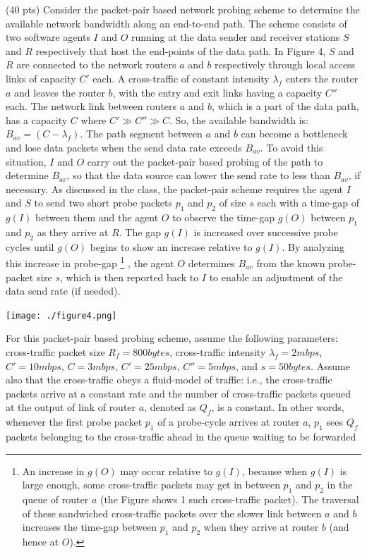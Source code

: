 \documentclass{jhwhw}
\begin{document}
\newpage
\problem{}
\noindent (40 pts) Consider the packet-pair based network probing scheme to determine the available network bandwidth along an end-to-end path. The scheme consists of two software agents $I$ and $O$ running at the data sender and receiver stations $S$ and $R$ respectively that host the end-points of the data path. In Figure 4, $S$ and $R$ are connected to the network routers $a$ and $b$ respectively through local access links of capacity $C'$ each. A cross-traffic of constant intensity $\lambda_{f}$ enters the router $a$ and leaves the router $b$, with the entry and exit links having a capacity $C''$ each. The network link between routers $a$ and $b$, which is a part of the data path, has a capacity $C$ where $C' \gg C'' \gg C$. So, the available bandwidth is: $B_{av} = (C - \lambda_{f})$. The path segment between $a$ and $b$ can become a bottleneck and lose data packets when the send data rate exceeds $B_{av}$. To avoid this situation, $I$ and $O$ carry out the packet-pair based probing of the path to determine $B_{av}$, so that the data source can lower the send rate to less than $B_{av}$, if necessary. As discussed in the class, the packet-pair scheme requires the agent $I$ and $S$ to send two short probe packets $p_{1}$ and $p_{2}$ of size $s$ each with a time-gap of $g(I)$ between them and the agent $O$ to observe the time-gap $g(O)$ between $p_{1}$ and $p_{2}$ as they arrive at $R$. The gap $g(I)$ is increased over successive probe cycles until $g(O)$ begins to show an increase relative to $g(I)$. By analyzing this increase in probe-gap
\footnote{An increase in $g(O)$ may occur relative to $g(I)$, because when $g(I)$ is large enough, some cross-traffic packets may get in between $p_{1}$ and $p_{2}$ in the queue of router $a$ (the Figure shows 1 such cross-traffic packet). The traversal of these sandwiched cross-traffic packets over the slower link between $a$ and $b$ increases the time-gap between $p_{1}$ and $p_{2}$ when they arrive at router $b$ (and hence at $O$).}
, the agent $O$ determines $B_{av}$ from the known probe-packet size $s$, which is then reported back to $I$ to enable an adjustment of the data send rate (if needed).\\
{\centering
	\texttt{[image: ./figure4.png]}\par
}
For this packet-pair based probing scheme, assume the following parameters: cross-traffic packet size $R_{f} = 800 bytes$, cross-traffic intensity $\lambda_{f} = 2 mbps$, $C' = 10 mbps$, $C = 3 mbps$, $C' = 25 mbps$, $C'' = 5 mbps$, and $s = 50 bytes$. Assume also that the cross-traffic obeys a fluid-model of traffic: i.e., the cross-traffic packets arrive at a constant rate and the number of cross-traffic packets queued at the output of link of router $a$, denoted as $Q_{f}$, is a constant. In other words, whenever the first probe packet $p_{1}$ of a probe-cycle arrives at router $a$, $p_{1}$ sees $Q_{f}$ packets belonging to the cross-traffic ahead in the queue waiting to be forwarded
\end{document}

